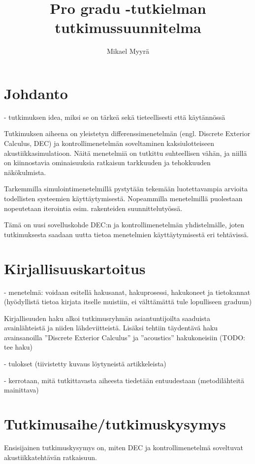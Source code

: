 \documentclass[utf8]{gradu3}
\title{Pro gradu -tutkielman tutkimussuunnitelma}
\author{Mikael Myyrä}
\begin{document}
\maketitle
\mainmatter
\sloppypar

\chapter{Johdanto}

- tutkimuksen idea, miksi se on tärkeä sekä tieteellisesti että käytännössä

Tutkimuksen aiheena on yleistetyn differenssimenetelmän
(engl. Discrete Exterior Calculus, DEC) ja kontrollimenetelmän
soveltaminen kaksiulotteiseen akustiikkasimulatioon.
Näitä menetelmiä on tutkittu suhteellisen vähän,
ja niillä on kiinnostavia ominaisuuksia
ratkaisun tarkkuuden ja tehokkuuden näkökulmista.

Tarkemmilla simulointimenetelmillä pystytään tekemään luotettavampia arvioita
todellisten systeemien käyttäytymisestä.
Nopeammilla menetelmillä puolestaan nopeutetaan iterointia
esim. rakenteiden suunnittelutyössä.

Tämä on uusi sovelluskohde DEC:n ja kontrollimenetelmän yhdistelmälle,
joten tutkimuksesta saadaan uutta tietoa menetelmien käyttäytymisestä eri tehtävissä.

\chapter{Kirjallisuuskartoitus}

- menetelmä: voidaan esitellä hakusanat, hakuprosessi, hakukoneet ja tietokannat (hyödyllistä tietoa kirjata itselle muistiin, ei välttämättä tule lopulliseen graduun)

Kirjallisuuden haku alkoi tutkimusryhmän asiantuntijoilta saaduista avainlähteistä
ja niiden lähdeviitteistä.
Lisäksi tehtiin täydentävä haku
avainsanoilla ''Discrete Exterior Calculus'' ja ''acoustics''
hakukoneisiin (TODO: tee haku)

- tulokset (tiivistetty kuvaus löytyneistä artikkeleista)

- kerrotaan, mitä tutkittavasta aiheesta tiedetään entuudestaan
(metodilähteitä mainittava)

\chapter{Tutkimusaihe/tutkimuskysymys}

Ensisijainen tutkimuskysymys on,
miten DEC ja kontrollimenetelmä soveltuvat akustiikkatehtävän ratkaisuun.
\end{document}
